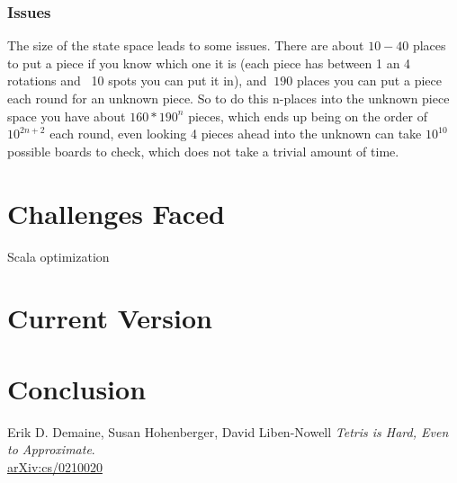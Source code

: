 \documentclass[ fontsize=11pt]{article}
\begin{document}
\subsubsection{Issues}
\par The size of the state space leads to some issues. There are about $10-40$ places to put a piece if you know which one it is (each piece has between 1 an 4 rotations and ~10 spots you can put it in), and $~190$ places you can put a piece each round for an unknown piece. So to do this n-places into the unknown piece space you have about $160*190^n$ pieces, which ends up being on the order of $10^{2n + 2}$ each round, even looking 4 pieces ahead into the unknown can take $10^{10}$ possible boards to check, which does not take a trivial amount of time.

\section{Challenges Faced}
\label{sec:challenges_faced}

\par Scala optimization


\section{Current Version}
\label{sec:current_version}



\section{Conclusion}
\label{sec:conclusion}

\newpage


\begin{thebibliography}{9}
Erik D. Demaine, Susan Hohenberger, David Liben-Nowell
\textit{
Tetris is Hard, Even to Approximate}.
\\\href{https://arxiv.org/abs/cs/0210020}{arXiv:cs/0210020}

\end{thebibliography}
\end{document}
